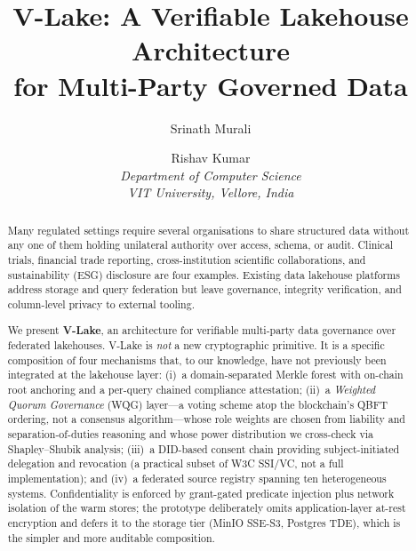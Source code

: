 \documentclass[10pt,twocolumn]{article}
\title{\textbf{V-Lake: A Verifiable Lakehouse Architecture\\
for Multi-Party Governed Data}}
\author{
  Srinath Murali \and Rishav Kumar\\[4pt]
  \textit{Department of Computer Science}\\
  \textit{VIT University, Vellore, India}
}
\date{}
\begin{document}
\maketitle

\begin{abstract}
Many regulated settings require several organisations to share
structured data without any one of them holding unilateral
authority over access, schema, or audit. Clinical trials, financial
trade reporting, cross-institution scientific collaborations, and
sustainability (ESG) disclosure are four examples. Existing data
lakehouse platforms address storage and query federation but
leave governance, integrity verification, and column-level privacy
to external tooling.

We present \textbf{V-Lake}, an architecture for verifiable
multi-party data governance over federated lakehouses. V-Lake is
\emph{not} a new cryptographic primitive. It is a specific
composition of four mechanisms that, to our knowledge, have not
previously been integrated at the lakehouse layer:
(i)~a domain-separated Merkle forest with on-chain root anchoring
and a per-query chained compliance attestation;
(ii)~a \emph{Weighted Quorum Governance} (WQG) layer---a voting
scheme atop the blockchain's QBFT ordering, not a consensus
algorithm---whose role weights are chosen from liability and
separation-of-duties reasoning and whose power distribution we
cross-check via Shapley--Shubik analysis;
(iii)~a DID-based consent chain providing subject-initiated
delegation and revocation (a practical subset of W3C SSI/VC, not a
full implementation);
and (iv)~a federated source registry spanning ten heterogeneous
systems. Confidentiality is enforced by grant-gated predicate
injection plus network isolation of the warm stores; the
prototype deliberately omits application-layer at-rest encryption
and defers it to the storage tier (MinIO SSE-S3, Postgres TDE),
which is the simpler and more auditable composition.


\end{abstract}
\end{document}
